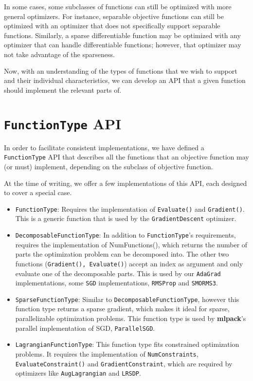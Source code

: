 \documentclass{article}
\begin{document}
In some cases, some subclasses of functions can still be optimized with more
general optimizers.  For instance, separable objective functions can still be
optimized with an optimizer that does not specifically support separable
functions.  Similarly, a sparse differentiable function may be optimized with
any optimizer that can handle differentiable functions; however, that optimizer
may not take advantage of the sparseness.

Now, with an understanding of the types of functions that we wish to support and
their individual characteristics, we can develop an API that a given function
should implement the relevant parts of.

\section{{\tt FunctionType} API}

In order to facilitate consistent implementations, we have defined a {\tt
FunctionType} API that describes all the functions that an objective function
may (or must) implement, depending on the subclass of objective function.

At the time of writing, we offer a few implementations of this API, each
designed to cover a special case.

\begin{itemize}
  \item{\tt FunctionType}: Requires the implementation of {\tt Evaluate()} and
  {\tt Gradient()}. This is a generic function that is used by the
  {\tt GradientDescent} optimizer.
  \item{\tt DecomposableFunctionType}: In addition to {\tt FunctionType}'s
  requirements, requires the implementation of {NumFunctions()}, which returns
  the number of parts the optimization problem can be decomposed into. The other
  two functions ({\tt Gradient(), Evaluate()}) accept an index as argument and
  only evaluate one of the decomposable parts. This is used by our {\tt AdaGrad}
  implementations, some {\tt SGD} implementations, {\tt RMSProp} and
  {\tt SMORMS3}.
  \item{\tt SparseFunctionType}: Similar to {\tt DecomposableFunctionType},
  however this function type returns a sparse gradient, which makes it ideal for
  sparse, parallelizable optimization problems. This function type is used by
  {\bf mlpack}'s parallel implementation of SGD, {\tt ParallelSGD}.
  \item{\tt LagrangianFunctionType}: This function type fits constrained
  optimization problems. It requires the implementation of {\tt NumConstraints},
  {\tt EvaluateConstraint()} and {\tt GradientConstraint}, which are required by
  optimizers like {\tt AugLagrangian} and {\tt LRSDP}.
\end{itemize}
\end{document}
